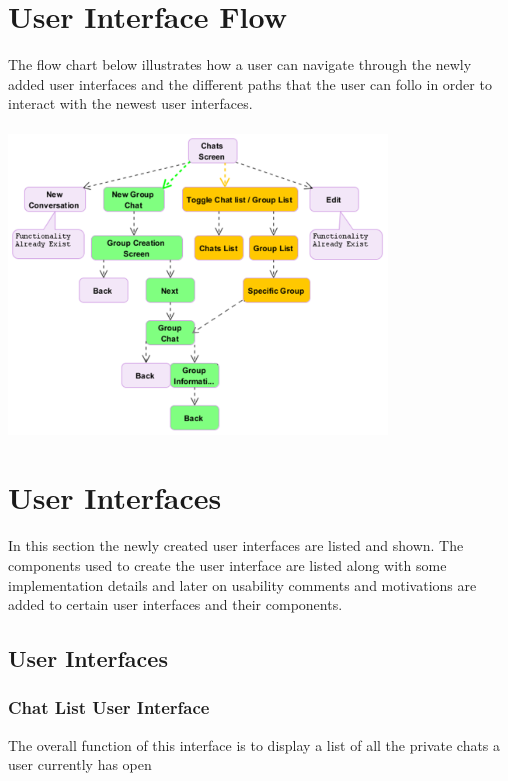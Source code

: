 \documentclass[11pt]{article}
\begin{document}


\setcounter{tocdepth}{3}
\setcounter{secnumdepth}{5}
\tableofcontents

\newpage
\section{User Interface Flow}
The flow chart below illustrates how a user can navigate through the newly added user interfaces and the different paths that the user can follo in order to interact with the newest user interfaces. \\\\
\includegraphics[width=380px]{images/flow.png}

\newpage
\section{User Interfaces}
In this section the newly created user interfaces are listed and shown. The components used to create the user interface are listed along with some implementation details and later on usability comments and motivations are added to certain user interfaces and their components.

\subsection{User Interfaces}

\subsubsection{Chat List User Interface}
The overall function of this interface is to display a list of all the private chats a user currently has open\\
\end{document}
